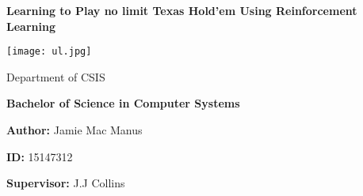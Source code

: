 
\begin{titlepage}

    \begin{center}

        \vspace*{1.5cm}

        \Huge

        \textbf{Learning to Play no limit Texas Hold'em Using Reinforcement Learning}

        \texttt{[image: ul.jpg]}

        \Large
        Department of CSIS

        \vspace{.25cm}
        \textbf{Bachelor of Science in Computer Systems}

        \vspace{.25cm}
        \textbf{Author: } Jamie Mac Manus

        \vspace{.25cm}
        \textbf{ID: } 15147312

        \vspace{.25cm}
        \textbf{Supervisor: } J.J Collins

    \end{center}

\end{titlepage}